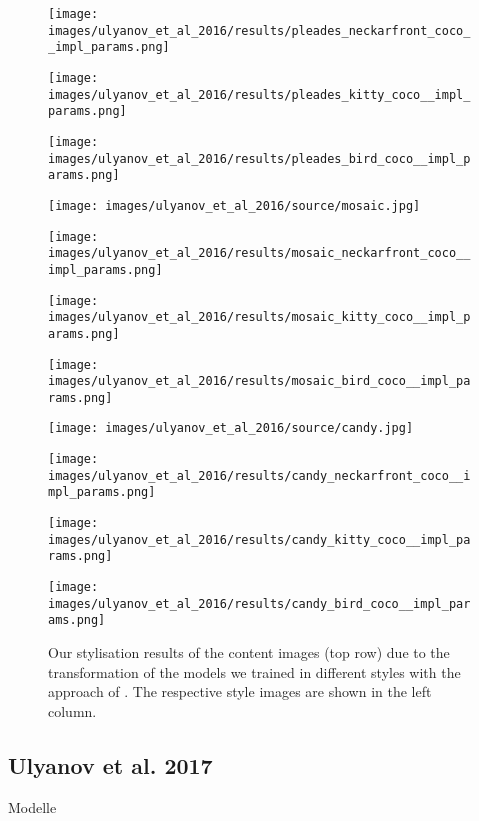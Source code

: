 \begin{figure}[H]
	\hfill%
	\begin{minipage}[t]{0.24\textwidth}
		\centering
		\texttt{[image: images/ulyanov\_et\_al\_2016/results/pleades\_neckarfront\_coco\_\_impl\_params.png]}
	\end{minipage}
	\hfill%
	\begin{minipage}[t]{0.24\textwidth}
		\centering
		\texttt{[image: images/ulyanov\_et\_al\_2016/results/pleades\_kitty\_coco\_\_impl\_params.png]}
	\end{minipage}
	\hfill%
	\begin{minipage}[t]{0.24\textwidth}
		\centering
		\texttt{[image: images/ulyanov\_et\_al\_2016/results/pleades\_bird\_coco\_\_impl\_params.png]}
	\end{minipage}
	\hfill%
	\begin{minipage}[t]{0.24\textwidth}
		\centering
		\texttt{[image: images/ulyanov\_et\_al\_2016/source/mosaic.jpg]}
	\end{minipage}
	\hfill%
	\begin{minipage}[t]{0.24\textwidth}
		\centering
		\texttt{[image: images/ulyanov\_et\_al\_2016/results/mosaic\_neckarfront\_coco\_\_impl\_params.png]}
	\end{minipage}
	\hfill%
	\begin{minipage}[t]{0.24\textwidth}
		\centering
		\texttt{[image: images/ulyanov\_et\_al\_2016/results/mosaic\_kitty\_coco\_\_impl\_params.png]}
	\end{minipage}
	\hfill%
	\begin{minipage}[t]{0.24\textwidth}
		\centering
		\texttt{[image: images/ulyanov\_et\_al\_2016/results/mosaic\_bird\_coco\_\_impl\_params.png]}
	\end{minipage}
	\hfill%
	\begin{minipage}[t]{0.24\textwidth}
		\centering
		\texttt{[image: images/ulyanov\_et\_al\_2016/source/candy.jpg]}
	\end{minipage}
	\hfill%
	\begin{minipage}[t]{0.24\textwidth}
		\centering
		\texttt{[image: images/ulyanov\_et\_al\_2016/results/candy\_neckarfront\_coco\_\_impl\_params.png]}
	\end{minipage}
	\hfill%
	\begin{minipage}[t]{0.24\textwidth}
		\centering
		\texttt{[image: images/ulyanov\_et\_al\_2016/results/candy\_kitty\_coco\_\_impl\_params.png]}
	\end{minipage}
	\hfill%
	\begin{minipage}[t]{0.24\textwidth}
		\centering
		\texttt{[image: images/ulyanov\_et\_al\_2016/results/candy\_bird\_coco\_\_impl\_params.png]}
	\end{minipage}
	\caption{Our stylisation results of the content images (top row) due to the transformation of the models we trained in different styles with the approach of \cite{ULVL2016}. The respective style images are shown in the left column.}
	\label{fig:ulyanov_et_al_2016_impl}
\end{figure}

\subsection{Ulyanov et al. 2017}
Modelle

